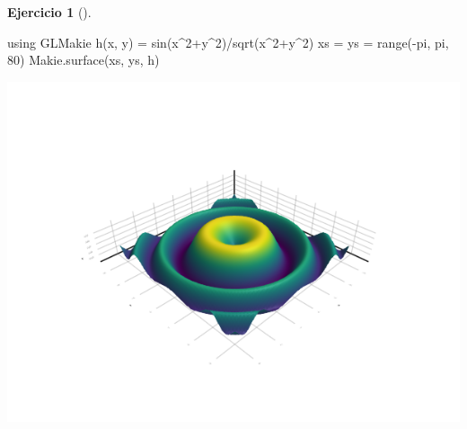 \documentclass[
  a4paper,
]{scrreport}
\newenvironment{Shaded}{\begin{snugshade}}{\end{snugshade}}
\newcommand{\BuiltInTok}[1]{\textcolor[rgb]{0.00,0.23,0.31}{#1}}
\newcommand{\ConstantTok}[1]{\textcolor[rgb]{0.56,0.35,0.01}{#1}}
\newcommand{\FloatTok}[1]{\textcolor[rgb]{0.68,0.00,0.00}{#1}}
\newcommand{\FunctionTok}[1]{\textcolor[rgb]{0.28,0.35,0.67}{#1}}
\newcommand{\ImportTok}[1]{\textcolor[rgb]{0.00,0.46,0.62}{#1}}
\newcommand{\NormalTok}[1]{\textcolor[rgb]{0.00,0.23,0.31}{#1}}
\newcommand{\OperatorTok}[1]{\textcolor[rgb]{0.37,0.37,0.37}{#1}}
\theoremstyle{definition}
\newtheorem{exercise}{Ejercicio}[chapter]
\theoremstyle{remark}
\begin{document}
\begin{exercise}[]
\begin{enumerate}
\begin{tcolorbox}
\begin{Shaded}
\begin{Highlighting}[]
\ImportTok{using} \BuiltInTok{GLMakie}
\FunctionTok{h}\NormalTok{(x, y) }\OperatorTok{=} \FunctionTok{sin}\NormalTok{(x}\OperatorTok{\^{}}\FloatTok{2}\OperatorTok{+}\NormalTok{y}\OperatorTok{\^{}}\FloatTok{2}\NormalTok{)}\OperatorTok{/}\FunctionTok{sqrt}\NormalTok{(x}\OperatorTok{\^{}}\FloatTok{2}\OperatorTok{+}\NormalTok{y}\OperatorTok{\^{}}\FloatTok{2}\NormalTok{)}
\NormalTok{xs }\OperatorTok{=}\NormalTok{ ys }\OperatorTok{=} \FunctionTok{range}\NormalTok{(}\OperatorTok{{-}}\ConstantTok{pi}\NormalTok{, }\ConstantTok{pi}\NormalTok{, }\FloatTok{80}\NormalTok{)}
\NormalTok{Makie.}\FunctionTok{surface}\NormalTok{(xs, ys, h)}
\end{Highlighting}
\end{Shaded}

  \includegraphics{09-derivadas-funciones-varias-variables_files/figure-pdf/cell-8-output-1.png}

  \end{tcolorbox}
\end{enumerate}

\end{exercise}
\end{document}

